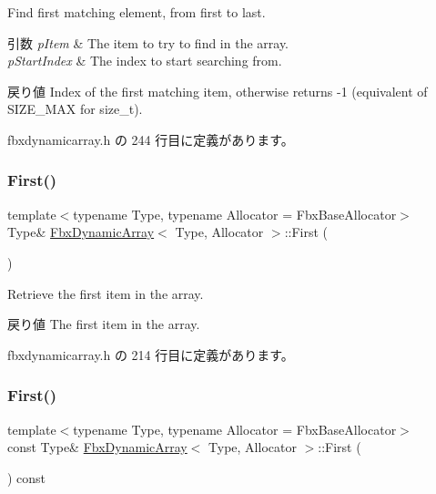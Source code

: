 Find first matching element, from first to last. 
\begin{DoxyParams}{引数}
{\em p\+Item} & The item to try to find in the array. \\
\hline
{\em p\+Start\+Index} & The index to start searching from. \\
\hline
\end{DoxyParams}
\begin{DoxyReturn}{戻り値}
Index of the first matching item, otherwise returns -\/1 (equivalent of S\+I\+Z\+E\+\_\+\+M\+AX for size\+\_\+t). 
\end{DoxyReturn}


 fbxdynamicarray.\+h の 244 行目に定義があります。

\mbox{\label{class_fbx_dynamic_array_a7eb1f73c2cc10719d104e647dfc0bd39}} 
\subsubsection{\texorpdfstring{First()}{First()}\hspace{0.1cm}{\footnotesize\ttfamily [1/2]}}
{\footnotesize\ttfamily template$<$typename Type, typename Allocator = Fbx\+Base\+Allocator$>$ \\
Type\& \hyperlink{class_fbx_dynamic_array}{Fbx\+Dynamic\+Array}$<$ Type, Allocator $>$\+::First (\begin{DoxyParamCaption}{ }\end{DoxyParamCaption})\hspace{0.3cm}{\ttfamily [inline]}}

Retrieve the first item in the array. \begin{DoxyReturn}{戻り値}
The first item in the array. 
\end{DoxyReturn}


 fbxdynamicarray.\+h の 214 行目に定義があります。

\mbox{\label{class_fbx_dynamic_array_ac7cc372d97cb5004e393cbadbd613249}} 
\subsubsection{\texorpdfstring{First()}{First()}\hspace{0.1cm}{\footnotesize\ttfamily [2/2]}}
{\footnotesize\ttfamily template$<$typename Type, typename Allocator = Fbx\+Base\+Allocator$>$ \\
const Type\& \hyperlink{class_fbx_dynamic_array}{Fbx\+Dynamic\+Array}$<$ Type, Allocator $>$\+::First (\begin{DoxyParamCaption}{ }\end{DoxyParamCaption}) const\hspace{0.3cm}{\ttfamily [inline]}}

